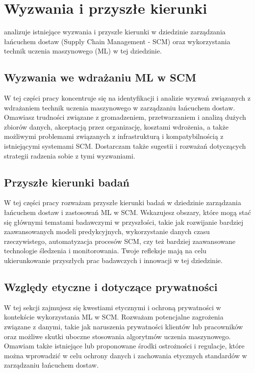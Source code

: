 \newpage %
\section{Wyzwania i przyszłe kierunki}
 analizuje istniejące wyzwania i przyszłe kierunki w dziedzinie zarządzania łańcuchem dostaw (Supply Chain Management - SCM) oraz wykorzystania technik uczenia maszynowego (ML) w tej dziedzinie. 

\subsection{Wyzwania we wdrażaniu ML w SCM}
W tej części pracy koncentruje się na identyfikacji i analizie wyzwań związanych z wdrażaniem technik uczenia maszynowego w zarządzaniu łańcuchem dostaw. Omawiasz trudności związane z gromadzeniem, przetwarzaniem i analizą dużych zbiorów danych, akceptacją przez organizację, kosztami wdrożenia, a także możliwymi problemami związanych z infrastrukturą i kompatybilnością z istniejącymi systemami SCM. Dostarczam także sugestii i rozważań dotyczących strategii radzenia sobie z tymi wyzwaniami.

\subsection{Przyszłe kierunki badań}
W tej części pracy rozważam przyszłe kierunki badań w dziedzinie zarządzania łańcuchem dostaw i zastosowań ML w SCM. Wskazujesz obszary, które mogą stać się głównymi tematami badawczymi w przyszłości, takie jak rozwijanie bardziej zaawansowanych modeli predykcyjnych, wykorzystanie danych czasu rzeczywistego, automatyzacja procesów SCM, czy też bardziej zaawansowane technologie śledzenia i monitorowania. Twoje refleksje mają na celu ukierunkowanie przyszłych prac badawczych i innowacji w tej dziedzinie.

\subsection{Względy etyczne i dotyczące prywatności}
 W tej sekcji zajmujesz się kwestiami etycznymi i ochroną prywatności w kontekście wykorzystania ML w SCM. Rozważam potencjalne zagrożenia związane z danymi, takie jak naruszenia prywatności klientów lub pracowników oraz możliwe skutki uboczne stosowania algorytmów uczenia maszynowego. Omawiam także istniejące lub proponowane środki ostrożności i regulacje, które można wprowadzić w celu ochrony danych i zachowania etycznych standardów w zarządzaniu łańcuchem dostaw.